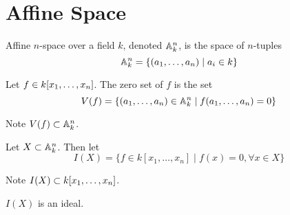 \section{Affine Space}

\begin{defn}
  Affine $n$-space over a field $k$, denoted $\mathbb{A}^{n}_{k}$, is the space of
  $n$-tuples
  \[ \mathbb{A}^{n}_{k} = \{(a_1, \ldots, a_n) \mid a_i \in k \}\]
\end{defn}

\begin{defn}
  Let $f \in k[x_1, \ldots, x_n]$. The zero set of $f$ is the set
  \[ V(f) = \{ (a_1, \ldots, a_n) \in \mathbb{A}^{n}_{k} \mid f(a_1, \ldots, a_n) = 0 \}\]
  
  Note $V(f) \subset \mathbb{A}^{n}_{k}$.
\end{defn}

\begin{defn}
Let $X \subset \mathbb{A}^{n}_{k}$. Then let
\[ I(X) = \{ f \in k[x_1, \ldots, x_n] \mid f(x) = 0, \forall x \in X \} \]

Note $I(X) \subset k[x_1, \ldots, x_n]$.
\end{defn}

\begin{prop}
$I(X)$ is an ideal.
\end{prop}
